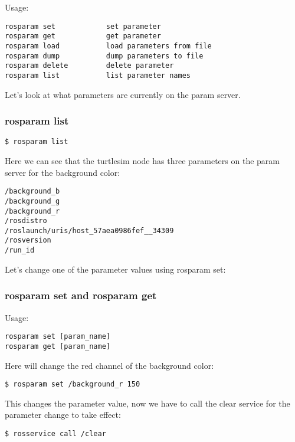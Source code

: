 Usage:
\begin{lstlisting}[breaklines=true languages=bash]
rosparam set            set parameter
rosparam get            get parameter
rosparam load           load parameters from file
rosparam dump           dump parameters to file
rosparam delete         delete parameter
rosparam list           list parameter names
\end{lstlisting}

Let's look at what parameters are currently on the param server.

\subsubsection{rosparam list}

\begin{lstlisting}[breaklines=true languages=bash]
$ rosparam list
\end{lstlisting}

Here we can see that the turtlesim node has three parameters on the param server for the background color:

\begin{lstlisting}[breaklines=true languages=bash]
/background_b
/background_g
/background_r
/rosdistro
/roslaunch/uris/host_57aea0986fef__34309
/rosversion
/run_id
\end{lstlisting}

Let's change one of the parameter values using rosparam set:

\subsubsection{rosparam set and rosparam get}
Usage:
\begin{lstlisting}[breaklines=true languages=bash]
rosparam set [param_name]
rosparam get [param_name]
\end{lstlisting}

Here will change the red channel of the background color:

\begin{lstlisting}[breaklines=true languages=bash]
$ rosparam set /background_r 150
\end{lstlisting}
This changes the parameter value, now we have to call the clear service for the parameter change to take effect:

\begin{lstlisting}[breaklines=true languages=bash]
$ rosservice call /clear
\end{lstlisting}

